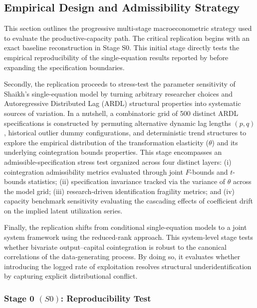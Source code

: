 \documentclass[11pt]{article}
\begin{document}
\subsection{Empirical Design and Admissibility Strategy}
\label{subsec:empirical_design}

This section outlines the progressive multi-stage macroeconometric strategy used to evaluate the productive-capacity path. The critical replication begins with an exact baseline reconstruction in Stage S0. This initial stage directly tests the empirical reproducibility of the single-equation results reported by \citet{Shaikh2016} before expanding the specification boundaries.

Secondly, the replication proceeds to stress-test the parameter sensitivity of Shaikh's single-equation model by turning arbitrary researcher choices and Autoregressive Distributed Lag (ARDL) structural properties into systematic sources of variation. In a nutshell, a combinatoric grid of 500 distinct ARDL specifications is constructed by permuting alternative dynamic lag lengths $(p,q)$, historical outlier dummy configurations, and deterministic trend structures to explore the empirical distribution of the transformation elasticity ($\theta$) and its underlying cointegration bounds properties. This stage encompasses an admissible-specification stress test organized across four distinct layers: (i) cointegration admissibility metrics evaluated through joint $F$-bounds and $t$-bounds statistics; (ii) specification invariance tracked via the variance of $\hat{\theta}$ across the model grid; (iii) research-driven identification fragility metrics; and (iv) capacity benchmark sensitivity evaluating the cascading effects of coefficient drift on the implied latent utilization series. 

Finally, the replication shifts from conditional single-equation models to a joint system framework using the \citet{Johansen1991} reduced-rank approach. This system-level stage tests whether bivariate output–capital cointegration is robust to the canonical correlations of the data-generating process. By doing so, it evaluates whether introducing the logged rate of exploitation resolves structural underidentification by capturing explicit distributional conflict.

\subsubsection{Stage 0 \texorpdfstring{$(S0)$}{}: Reproducibility Test}
\label{subsec:S0_reproducibility}
\end{document}
